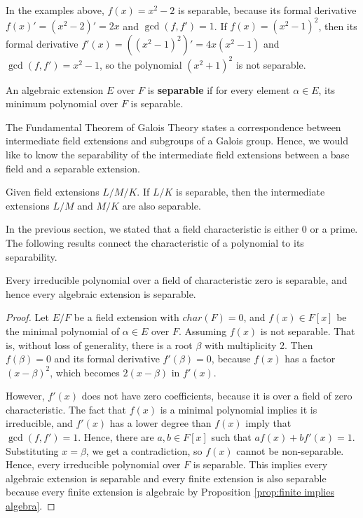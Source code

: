 \documentclass[../main.tex]{subfiles}
\begin{document}
\begin{example}
In the examples above, $f(x)=x^2-2$ is separable, because its formal derivative $f(x)'=(x^2-2)' = 2x$ and $\gcd(f,f')=1$. If $f(x)=(x^2-1)^2$, then its formal derivative $f'(x)=((x^2-1)^2)'=4x(x^2-1)$ and $\gcd(f,f')=x^2-1$, so the polynomial $(x^2+1)^2$ is not separable. 
\end{example}

\reversemarginpar
{}
\begin{definition}
An algebraic extension $E$ over $F$ is \textbf{separable} if for every element $\alpha \in E$, its minimum polynomial over $F$ is separable. 
\end{definition}

The Fundamental Theorem of Galois Theory states a correspondence between intermediate field extensions and subgroups of a Galois group. Hence, we would like to know the separability of the intermediate field extensions between a base field and a separable extension.    

\reversemarginpar
{}
\begin{theorem}
Given field extensions $L/M/K$. If $L/K$ is separable, then the intermediate extensions $L/M$ and $M/K$ are also separable. 
\end{theorem}


\reversemarginpar
{}
In the previous section, we stated that a field characteristic is either 0 or a prime. The following results connect the characteristic of a polynomial to its separability.

\begin{theorem}
\label{thm:minPolyIsSepInChar0Field}
Every irreducible polynomial over a field of characteristic zero is separable, and hence every algebraic extension is separable. 
\end{theorem}

\begin{proof}
Let $E/F$ be a field extension with $char(F)=0$, and $f(x) \in F[x]$ be the minimal polynomial of $\alpha \in E$ over $F$. Assuming $f(x)$ is not separable. That is, without loss of generality, there is a root $\beta$ with multiplicity 2. Then $f(\beta)=0$ and its formal derivative $f'(\beta)=0$, because $f(x)$ has a factor $(x-\beta)^2$, which becomes $2(x-\beta)$ in $f'(x)$. 

However, $f'(x)$ does not have zero coefficients, because it is over a field of zero characteristic. The fact that $f(x)$ is a minimal polynomial implies it is irreducible, and $f'(x)$ has a lower degree than $f(x)$ imply that $\gcd(f,f')=1$. Hence, there are $a,b \in F[x]$ such that $af(x)+bf'(x)=1$. Substituting $x=\beta$, we get a contradiction, so $f(x)$ cannot be non-separable. Hence, every irreducible polynomial over $F$ is separable. This implies every algebraic extension is separable and every finite extension is also separable because every finite extension is algebraic by Proposition \ref{prop:finite implies algebra}.       
\end{proof}
\end{document}
